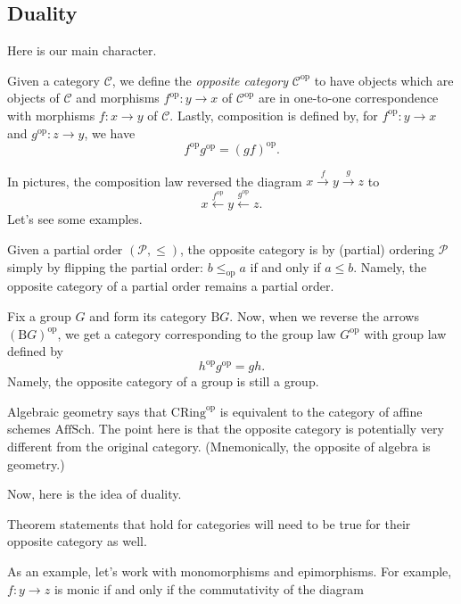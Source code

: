 \subsection{Duality}
Here is our main character.
\begin{definition}
	Given a category $\mathcal C$, we define the \textit{opposite category} $\mathcal C^{\mathrm{op}}$ to have objects which are objects of $\mathcal C$ and morphisms $f^{\mathrm{op}}:y\to x$ of $\mathcal C^{\mathrm{op}}$ are in one-to-one correspondence with morphisms $f:x\to y$ of $\mathcal C$. Lastly, composition is defined by, for $f^\mathrm{op}:y\to x$ and $g^{\mathrm{op}}:z\to y$, we have
	\[f^\mathrm{op}g^\mathrm{op}=(gf)^\mathrm{op}.\]
\end{definition}
In pictures, the composition law reversed the diagram $x\stackrel f\to y\stackrel g\to z$ to
\[x\stackrel{f^\mathrm{op}}\leftarrow y\stackrel{g^\mathrm{op}}\leftarrow z.\]
Let's see some examples.
\begin{example}
	Given a partial order $(\mathcal P,\le)$, the opposite category is by (partial) ordering $\mathcal P$ simply by flipping the partial order: $b\le_\mathrm{op}a$ if and only if $a\le b$. Namely, the opposite category of a partial order remains a partial order.
\end{example}
\begin{example}
	Fix a group $G$ and form its category $\mathrm BG$. Now, when we reverse the arrows $(\mathrm BG)^{\mathrm{op}}$, we get a category corresponding to the group law $G^\mathrm{op}$ with group law defined by
	\[h^\mathrm{op}g^\mathrm{op}=gh.\]
	Namely, the opposite category of a group is still a group.
\end{example}
\begin{example}
	Algebraic geometry says that $\mathrm{CRing}^\mathrm{op}$ is equivalent to the category of affine schemes $\mathrm{AffSch}$. The point here is that the opposite category is potentially very different from the original category. (Mnemonically, the opposite of algebra is geometry.)
\end{example}
Now, here is the idea of duality.
\begin{idea}
	Theorem statements that hold for categories will need to be true for their opposite category as well.
\end{idea}
As an example, let's work with monomorphisms and epimorphisms. For example, $f:y\to z$ is monic if and only if the commutativity of the diagram

